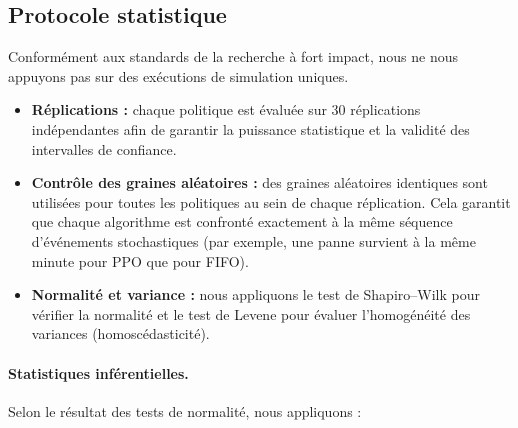\documentclass[11pt,a4paper]{article}
\begin{document}
\subsection{Protocole statistique}
\label{sec:proto}

Conformément aux standards de la recherche à fort impact, nous ne nous appuyons pas sur des exécutions de simulation uniques.

\begin{itemize}
  \item \textbf{Réplications :} chaque politique est évaluée sur 30 réplications indépendantes afin de garantir la puissance statistique et la validité des intervalles de confiance.
  \item \textbf{Contrôle des graines aléatoires :} des graines aléatoires identiques sont utilisées pour toutes les politiques au sein de chaque réplication. Cela garantit que chaque algorithme est confronté exactement à la même séquence d'événements stochastiques (par exemple, une panne survient à la même minute pour PPO que pour FIFO).
  \item \textbf{Normalité et variance :} nous appliquons le test de Shapiro--Wilk pour vérifier la normalité et le test de Levene pour évaluer l'homogénéité des variances (homoscédasticité).
\end{itemize}

\paragraph{Statistiques inférentielles.} Selon le résultat des tests de normalité, nous appliquons :
\end{document}
